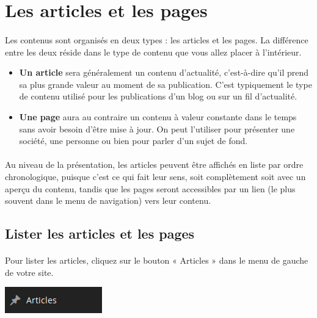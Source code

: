 \documentclass[10pt,a4paper]{article}
\begin{document}
\section{Les articles et les pages}
\paragraph{} Les contenus sont organisés en deux types : les articles et les pages. La différence entre les deux réside dans le type de contenu que vous allez placer à l’intérieur.
\begin{itemize}
\item \textbf{Un article} sera généralement un contenu d’actualité, c’est-à-dire qu’il prend sa plus grande valeur au moment de sa publication. C’est typiquement le type de contenu utilisé pour les publications d’un blog ou sur un fil d’actualité.
\item \textbf{Une page} aura au contraire un contenu à valeur constante dans le temps sans avoir besoin d’être mise à jour. On peut l’utiliser pour présenter une société, une personne ou bien pour parler d’un sujet de fond.
\end{itemize}
\paragraph{}Au niveau de la présentation, les articles peuvent être affichés en liste par ordre chronologique, puisque c’est ce qui fait leur sens, soit complètement soit avec un aperçu du contenu, tandis que les pages seront accessibles par un lien (le plus souvent dans le menu de navigation) vers leur contenu.
\subsection{Lister les articles et les pages}
\paragraph{}Pour lister les articles, cliquez sur le bouton « Articles » dans le menu de gauche de votre site.
\begin{center}
\includegraphics[scale=0.5]{img/0059.png}
\end{center}
\end{document}

